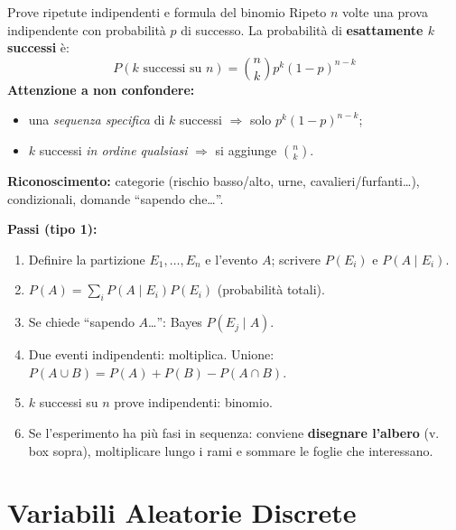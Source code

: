 \documentclass[11pt]{article}
\begin{document}
\begin{concetto}{Prove ripetute indipendenti e formula del binomio}
Ripeto $n$ volte una prova indipendente con probabilit\`a $p$ di successo. La probabilit\`a di \textbf{esattamente $k$ successi} \`e:
\[ P(k \text{ successi su } n) = \binom{n}{k} p^k (1-p)^{n-k} \]
\textbf{Attenzione a non confondere:}
\begin{itemize}[leftmargin=1.2em,itemsep=1pt,topsep=2pt]
\item una \emph{sequenza specifica} di $k$ successi $\Rightarrow$ solo $p^k(1-p)^{n-k}$;
\item $k$ successi \emph{in ordine qualsiasi} $\Rightarrow$ si aggiunge $\binom{n}{k}$.
\end{itemize}
\end{concetto}

\begin{trucco}
\textbf{Riconoscimento:} categorie (rischio basso/alto, urne, cavalieri/furfanti\dots), condizionali, domande ``sapendo che\dots''.

\textbf{Passi (tipo 1):}
\begin{enumerate}[leftmargin=1.4em,itemsep=1pt,topsep=2pt]
\item Definire la partizione $E_1,\dots,E_n$ e l'evento $A$; scrivere $P(E_i)$ e $P(A\mid E_i)$.
\item $P(A) = \sum_i P(A\mid E_i)P(E_i)$ (probabilit\`a totali).
\item Se chiede ``sapendo $A$\dots'': Bayes $P(E_j\mid A)$.
\item Due eventi indipendenti: moltiplica. Unione: $P(A\cup B)=P(A)+P(B)-P(A\cap B)$.
\item $k$ successi su $n$ prove indipendenti: binomio.
\item Se l'esperimento ha pi\`u fasi in sequenza: conviene \textbf{disegnare l'albero} (v. box sopra), moltiplicare lungo i rami e sommare le foglie che interessano.
\end{enumerate}
\end{trucco}

\newpage
\section{Variabili Aleatorie Discrete}
\end{document}
